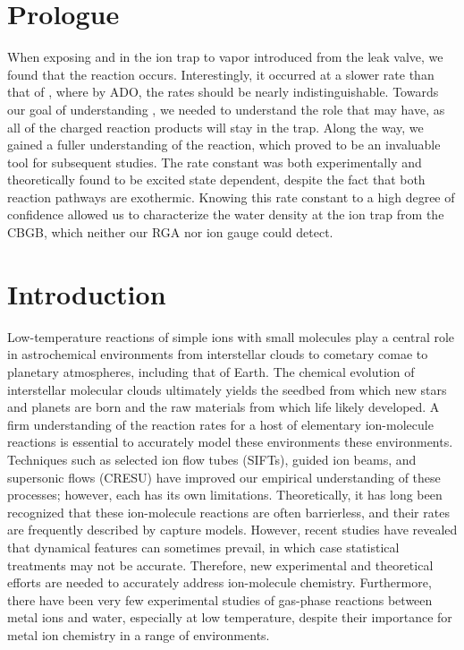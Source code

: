 \section{Prologue}
When exposing  and  in the ion trap to  vapor introduced from the leak valve, we found that the reaction  occurs. Interestingly, it occurred at a slower rate than that of , where by ADO, the rates should be nearly indistinguishable. Towards our goal of understanding , we needed to understand the role that  may have, as all of the charged reaction products will stay in the trap. Along the way, we gained a fuller understanding of the  reaction, which proved to be an invaluable tool for subsequent studies. The rate constant was both experimentally and theoretically found to be excited state dependent, despite the fact that both reaction pathways are exothermic. Knowing this rate constant to a high degree of confidence allowed us to characterize the water density at the ion trap from the CBGB, which neither our RGA nor ion gauge could detect.

\section{Introduction}
Low-temperature reactions of simple ions with small molecules play a central role in astrochemical environments from interstellar clouds to cometary comae to planetary atmospheres, including that of Earth\cite{Agundez2013,Krasnopolsky2014}. The chemical evolution of interstellar molecular clouds ultimately yields the seedbed from which new stars and planets are born and the raw materials from which life likely developed. A firm understanding of the reaction rates for a host of elementary ion-molecule reactions is essential to accurately model these environments these environments. Techniques such as selected ion flow tubes (SIFTs)\cite{Adams1976}, guided ion beams\cite{Armentrout2002}, and supersonic flows (CRESU)\cite{Sims2002} have improved our empirical understanding of these processes; however, each has its own limitations.\cite{Smith2000,Snow2008} Theoretically, it has long been recognized that these ion-molecule reactions are often barrierless, and their rates are frequently described by capture models.\cite{Gioumousis1958a} However, recent studies have revealed that dynamical features can sometimes prevail,\cite{Lourderaj2008,Li2014,Carrascosa2017} in which case statistical treatments may not be accurate.\cite{Hase2014,Clary1990} Therefore, new experimental and theoretical efforts are needed to accurately address ion-molecule chemistry. Furthermore, there have been very few experimental studies of gas-phase reactions between metal ions and water, especially at low temperature, despite their importance for metal ion chemistry in a range of environments.\cite{Highberger2001,Oppenheimer2002,VanDishoeck2013a}

